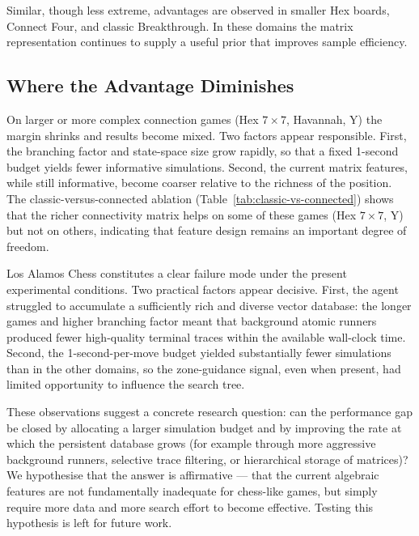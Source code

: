 \documentclass[11pt,a4paper]{article}
\theoremstyle{plain}
\theoremstyle{definition}
\begin{document}
\vspace{0.5em}

Similar, though less extreme, advantages are observed in smaller Hex boards, Connect Four, and classic Breakthrough. In these domains the matrix representation continues to supply a useful prior that improves sample efficiency.

\vspace{0.5em}

\subsection{Where the Advantage Diminishes}

\vspace{0.5em}

On larger or more complex connection games (Hex \(7\times7\), Havannah, Y) the margin shrinks and results become mixed. Two factors appear responsible. First, the branching factor and state-space size grow rapidly, so that a fixed 1-second budget yields fewer informative simulations. Second, the current matrix features, while still informative, become coarser relative to the richness of the position. The classic-versus-connected ablation (Table~\ref{tab:classic-vs-connected}) shows that the richer connectivity matrix helps on some of these games (Hex \(7\times7\), Y) but not on others, indicating that feature design remains an important degree of freedom.

\vspace{0.5em}

Los Alamos Chess constitutes a clear failure mode under the present experimental conditions. 
Two practical factors appear decisive. First, the agent struggled to accumulate a sufficiently 
rich and diverse vector database: the longer games and higher branching factor meant that 
background atomic runners produced fewer high-quality terminal traces within the available 
wall-clock time. Second, the 1-second-per-move budget yielded substantially fewer 
simulations than in the other domains, so the zone-guidance signal, even when present, 
had limited opportunity to influence the search tree. 

\vspace{0.5em}

These observations suggest a concrete research question: can the performance gap be closed 
by allocating a larger simulation budget and by improving the rate at which the persistent 
database grows (for example through more aggressive background runners, selective 
trace filtering, or hierarchical storage of matrices)? We hypothesise that the answer is 
affirmative — that the current algebraic features are not fundamentally inadequate for 
chess-like games, but simply require more data and more search effort to become effective. 
Testing this hypothesis is left for future work.
\end{document}
